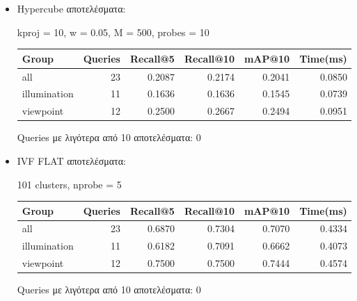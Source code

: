 \documentclass [conference]{IEEEtran}
\begin{document}
\begin{itemize}
    \item Hypercube αποτελέσματα:
    \begin{table}[H]
    \centering
    \small
    \setlength{\tabcolsep}{3pt}
    kproj = 10, w = 0.05, M = 500, probes = 10
    \par\smallskip
    \begin{tabular}{l r r r r r}
    \hline
    \textbf{Group} & \textbf{Queries} & \textbf{Recall@5} & \textbf{Recall@10} & \textbf{mAP@10} & \textbf{Time(ms)} \\
    \hline
    all & 23 & 0.2087 & 0.2174 & 0.2041 & 0.0850 \\
    illumination & 11 & 0.1636 & 0.1636 & 0.1545 & 0.0739 \\
    viewpoint & 12 & 0.2500 & 0.2667 & 0.2494 & 0.0951 \\
    \hline
    \end{tabular}
    \par\smallskip
    \footnotesize Queries με λιγότερα από 10 αποτελέσματα: 0
    \end{table}


    \item IVF FLAT αποτελέσματα:
    \begin{table}[H]
    \centering
    \small
    \setlength{\tabcolsep}{3pt}
    101 clusters, nprobe = 5
    \par\smallskip
    \begin{tabular}{l r r r r r}
    \hline
    \textbf{Group} & \textbf{Queries} & \textbf{Recall@5} & \textbf{Recall@10} & \textbf{mAP@10} & \textbf{Time(ms)} \\
    \hline
    all & 23 & 0.6870 & 0.7304 & 0.7070 & 0.4334 \\
    illumination & 11 & 0.6182 & 0.7091 & 0.6662 & 0.4073 \\
    viewpoint & 12 & 0.7500 & 0.7500 & 0.7444 & 0.4574 \\
    \hline
    \end{tabular}
    \par\smallskip
    \footnotesize Queries με λιγότερα από 10 αποτελέσματα: 0
    \end{table}

        

\end{itemize}
\end{document}
